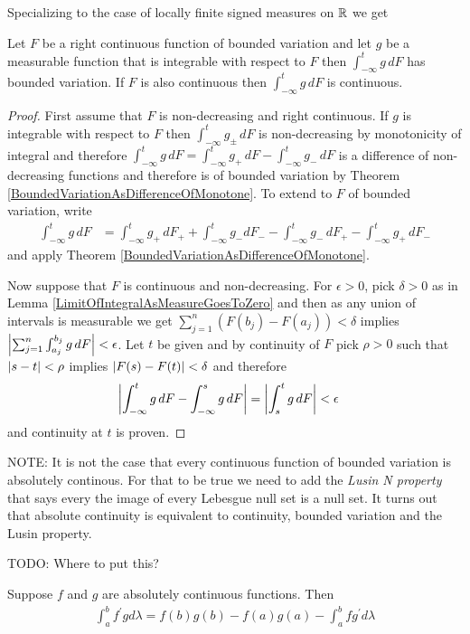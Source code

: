 Specializing to the case of locally finite signed measures on $\mathbb{R}$ we get
\begin{cor}\label{StieltjesIntegralBoundedVariationAndContinuous}Let $F$ be a right continuous function of bounded variation and let $g$ be a
  measurable function that is integrable with respect to $F$ then
  $\int_{-\infty}^t g \, dF$ has bounded variation.  If $F$ is also
  continuous then $\int_{-\infty}^t g \, dF$ is continuous.
\end{cor}
\begin{proof}
First assume that $F$ is
non-decreasing and right continuous.  If $g$ is integrable with respect to $F$ then
$\int_{-\infty}^t g_\pm \, dF$ is non-decreasing by monotonicity of integral and therefore
$\int_{-\infty}^t g \, dF = \int_{-\infty}^t g_+ \, dF -
\int_{-\infty}^t g_- \, dF$ is a difference of non-decreasing
functions and therefore is of bounded variation by Theorem \ref{BoundedVariationAsDifferenceOfMonotone}.  To extend to $F$ of
bounded variation, write 
\begin{align*}
\int_{-\infty}^t g \, dF &= \int_{-\infty}^t g_+ \, dF_+ +
\int_{-\infty}^t g_- dF_- -
\int_{-\infty}^t g_- \, dF_+ - \int_{-\infty}^t g_+ \, dF_-
\end{align*}
and apply Theorem  \ref{BoundedVariationAsDifferenceOfMonotone}.

Now suppose that $F$ is continuous and non-decreasing.  For $\epsilon > 0$, pick $\delta>0$ as in Lemma
\ref{LimitOfIntegralAsMeasureGoesToZero} and then as any union of
intervals is measurable we get $\sum_{j=1}^n (F(b_j)-F(a_j)) < \delta$
implies $\left \vert \sum_{j=1}^n \int_{a_j}^{b_j} g \, dF \right \vert < \epsilon$.
Let $t$ be given and by continuity of $F$ pick $\rho > 0$ such that
$\left \vert s - t \right \vert < \rho$ implies $\left \vert F(s) - F(t) \right \vert < \delta$ and
therefore 
\begin{align*}
\left \vert \int_{-\infty}^t g \, dF - \int_{-\infty}^s g \, dF \right \vert &=
\left \vert \int_s^t g \, dF \right \vert < \epsilon
\end{align*}
and continuity at $t$ is proven.
\end{proof}

NOTE:  It is not the case that every continuous function of bounded
variation is absolutely continous.  For that to be true we need to add
the \emph{Lusin N property} that says every the image of every Lebesgue
null set is a null set.  It turns out that absolute continuity is
equivalent to continuity, bounded variation and the Lusin property.

TODO: Where to put this?
\begin{cor}\label{IntegrationByParts}Suppose $f$
  and $g$ are absolutely continuous functions.  Then 
\begin{align*}
\int_a^b f^\prime g d\lambda
  = f(b)g(b) - f(a)g(a) - \int_a^b f g^\prime d \lambda
\end{align*}
\end{cor}

